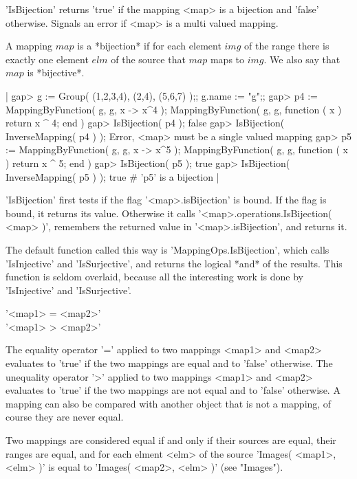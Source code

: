 'IsBijection'  returns 'true'  if the  mapping  <map> is a bijection  and
'false' otherwise.  Signals an error if <map> is a multi valued mapping.

A mapping $map$ is a *bijection* if  for each  element $img$ of the range
there is exactly  one  element  $elm$  of the  source that $map$ maps  to
$img$.  We also say that $map$ is *bijective*.

|    gap> g := Group( (1,2,3,4), (2,4), (5,6,7) );;  g.name := "g";;
    gap> p4 := MappingByFunction( g, g, x -> x^4 );
    MappingByFunction( g, g, function ( x )
        return x ^ 4;
    end )
    gap> IsBijection( p4 );
    false
    gap> IsBijection( InverseMapping( p4 ) );
    Error, <map> must be a single valued mapping
    gap> p5 := MappingByFunction( g, g, x -> x^5 );
    MappingByFunction( g, g, function ( x )
        return x ^ 5;
    end )
    gap> IsBijection( p5 );
    true
    gap> IsBijection( InverseMapping( p5 ) );
    true    # 'p5' is a bijection |

'IsBijection' first tests if  the flag '<map>.isBijection'  is bound.  If
the   flag is  bound,    it    returns its  value.   Otherwise it   calls
'<map>.operations.IsBijection( <map> )', remembers  the returned value in
'<map>.isBijection', and  returns it.

The  default function called this  way is 'MappingOps.IsBijection', which
calls 'IsInjective' and 'IsSurjective',  and returns the logical *and* of
the  results.   This  function  is   seldom  overlaid,  because  all  the
interesting work is done by 'IsInjective' and 'IsSurjective'.


'<map1> = <map2>' \\
'<map1> \<> <map2>'

The  equality operator  '=' applied  to two  mappings  <map1>  and <map2>
evaluates to 'true' if   the   two mappings    are equal and   to 'false'
otherwise.  The unequality operator '\<>' applied  to two mappings <map1>
and <map2> evaluates to 'true' if the  two mappings are  not equal and to
'false' otherwise.  A  mapping can also  be compared  with another object
that is not a mapping, of course they are never equal.

Two mappings are considered equal if and only if their sources are equal,
their ranges are equal, and for each elment <elm> of  the source 'Images(
<map1>, <elm> )' is equal to 'Images( <map2>, <elm> )' (see "Images").

